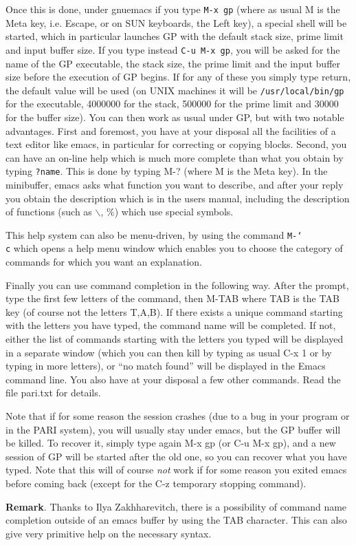 Once this is done, under gnuemacs if you type {\tt M-x gp} (where as usual M is the
Meta key, i.e. Escape, or on SUN keyboards, the Left key), a special shell
will be started, which in particular launches GP with the default stack size,
prime limit and input buffer size. If you type instead {\tt C-u M-x gp},
you will be asked for the name of the GP executable, the stack size, the prime limit
and the input buffer size before the execution of GP begins. If for any of these
you simply type return, the default value will be used (on UNIX machines it will be
{\tt /usr/local/bin/gp} for the executable, 4000000 for the stack, 500000 for the
prime limit and 30000 for the buffer size).
\smallskip
You can then work as usual under GP, but with two notable advantages.
First and foremost, you have at your
disposal all the facilities of a text editor like emacs, in particular for
correcting or copying blocks. Second, you can have an on-line help which is
much more complete than what you obtain by typing {\tt ?name}.
This is done by typing M-? (where M is the Meta key). In the minibuffer,
emacs asks what function you want to describe, and after your reply you obtain
the description which is in the users manual, including the description of
functions (such as $\backslash$, $\%$) which use special symbols.

This help system can also be menu-driven, by using the command {\tt M-\char`\\ c}
which opens a help menu window which enables you to choose the category
of commands for which you want an explanation.

Finally you can use command completion in the following way. After the prompt,
type the first few letters of the command, then M-TAB where TAB is the TAB key
(of course not the letters T,A,B). If there exists a unique command starting
with the letters you have typed, the command name will be completed. If not,
either the list of commands starting with the letters you typed will be
displayed in a separate window (which you can then kill by typing as usual
C-x 1 or by typing in more letters), or ``no match found'' will be displayed
in the Emacs command line.
\smallskip
You also have at your disposal a few other commands. Read the file
pari.txt for details.

Note that if for some reason the session crashes (due to a bug in your program
or in the PARI system), you will usually stay under emacs, but the GP buffer
will be killed. To recover it, simply type again M-x gp (or C-u M-x gp), and
a new session of GP will be started after the old one, so you can recover
what you have typed. Note that this will of course {\sl not} work if for some
reason you exited emacs before coming back (except for the C-z temporary
stopping command).

{\bf Remark}. Thanks to Ilya Zakhharevitch, there is a possibility
of command name completion outside of an emacs buffer by using the
TAB character. This can also give very primitive help on the necessary
syntax.


\vfill\eject
